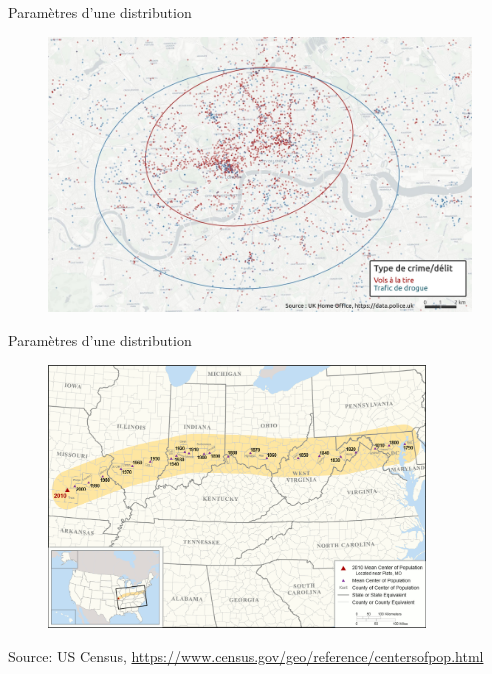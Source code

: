 \begin{frame}{Paramètres d'une distribution}

\begin{figure}
\includegraphics[width=12cm]{Crimes.jpg}
\end{figure}

\end{frame}



\begin{frame}{Paramètres d'une distribution}

\begin{figure}
\includegraphics[width=10cm]{Centerpop.png}
\end{figure}

\footnotesize
Source: US Census, \url{https://www.census.gov/geo/reference/centersofpop.html}
\normalsize

\end{frame}


